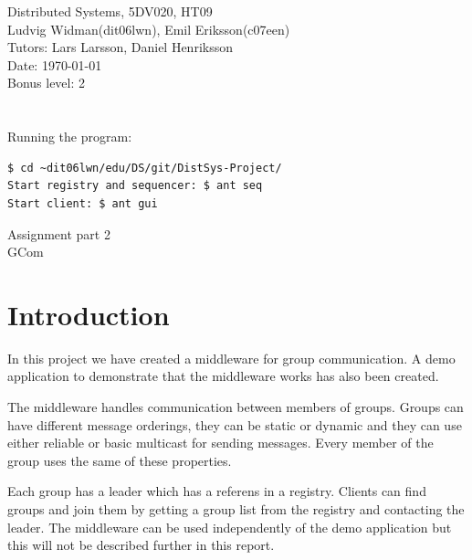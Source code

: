 \documentclass[english]{article}
\def\author			{Ludvig Widman(dit06lwn), Emil Eriksson(c07een)}
\def\course			{Distributed Systems, 5DV020, HT09}
\def\delivery		{Assignment part 2}
\def\trivialname	{GCom}
\def\tutor			{Lars Larsson, Daniel Henriksson}
\begin{document}
\begin{titlepage}
\noindent
\course \\
\author \\

\noindent
Tutors: \tutor \\
Date: \today \\
Bonus level: 2\\
\\
\\
Running the program: 
\begin{verbatim}
$ cd ~dit06lwn/edu/DS/git/DistSys-Project/
Start registry and sequencer: $ ant seq
Start client: $ ant gui
\end{verbatim}

\begin{center}
	\vspace{20mm}
        \Huge \delivery \\
        \vspace{5mm}
        \Huge \trivialname \\
        \vspace{20mm}
        
\end{center}

\end{titlepage}
\thispagestyle{empty}
\tableofcontents
\newpage
{}

\setlength{\parindent}{0pt}
\setlength{\parskip}{1ex plus 0.5ex minus 0.2ex}


\section{Introduction}
In this project we have created a middleware for group communication. A demo application to demonstrate that the middleware works has also been created. 

The middleware handles communication between members of groups. Groups can have different message orderings, they can be static or dynamic and they can use either reliable or basic multicast for sending messages. Every member of the group uses the same of these properties.

Each group has a leader which has a referens in a registry. Clients can find groups and join them by getting a group list from the registry and contacting the leader.
The middleware can be used independently of the demo application but this will not be described further in this report.
\end{document}
